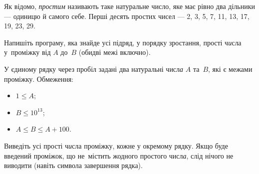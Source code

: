 ﻿Як відомо, {\it простим} називають таке натуральне число, яке має рівно два дільники --- одиницю й самого себе. Перші десять простих чисел --- 2, 3, 5, 7, 11, 13, 17, 19, 23, 29. 

Напишіть програму, яка знайде усі підряд, у порядку зростання, прості ч{\it и}сла у~проміжку від $A$ до~$B$ (обидві межі включно).

\InputFile
У єдиному рядку через пробіл задані два натуральні числ{\it а} $A$ та~$B$, які є межами проміжку.
Обмеження:
\begin{itemize}
\item
$1\leqslant A$;
\item
$B\leqslant 10^{13}$;
\item
$A\leqslant B\leqslant A+100$.
\end{itemize}

\OutputFile
Виведіть усі прості ч{\it и}сла проміжку, кожне у окремому рядку. Якщо буде введений проміжок, що не~містить жодного простого числ{\it а}, слід нічого не виводити (навіть символа завершення рядка).


\Examples
\begin{example}
%
%
\end{example}

\Note